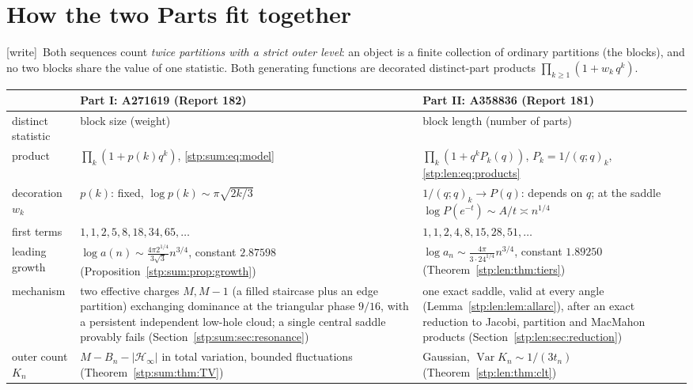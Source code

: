 \documentclass[11pt]{article}
\theoremstyle{remark}\newtheorem{remark}[theorem]{Remark}
\newcommand{\cH}{\mathcal H}
\DeclareMathOperator{\Var}{Var}
\newcommand{\wtag}{\textup{[write]}}
\begin{document}
\section{How the two Parts fit together}\label{stp:sec:guide}

\wtag\ Both sequences count \emph{twice partitions with a strict outer
level}: an object is a finite collection of ordinary partitions (the
blocks), and no two blocks share the value of one statistic. Both
generating functions are decorated distinct-part products
$\prod_{k\ge1}(1+w_k\,q^k)$.

\begin{center}
\small
\begin{tabular}{@{}>{\raggedright\arraybackslash}p{}>{\raggedright\arraybackslash}p{}>{\raggedright\arraybackslash}p{}@{}}
\toprule
& Part I: A271619 (Report 182) & Part II: A358836 (Report 181)\\
\midrule
distinct statistic & block size (weight) & block length (number of parts)\\
product & $\prod_k(1+p(k)q^k)$, \eqref{stp:sum:eq:model} & $\prod_k(1+q^kP_k(q))$, $P_k=1/(q;q)_k$, \eqref{stp:len:eq:products}\\
decoration $w_k$ & $p(k)$: fixed, $\log p(k)\sim\pi\sqrt{2k/3}$ & $1/(q;q)_k\to P(q)$: depends on $q$; at the saddle $\log P(e^{-t})\sim A/t\asymp n^{1/4}$\\
first terms & $1,1,2,5,8,18,34,65,\dots$ & $1,1,2,4,8,15,28,51,\dots$\\
leading growth & $\log a(n)\sim\frac{4\pi2^{1/4}}{3\sqrt3}n^{3/4}$, constant $2.87598$ (Proposition~\ref{stp:sum:prop:growth}) & $\log a_n\sim\frac{4\pi}{3\cdot24^{1/4}}n^{3/4}$, constant $1.89250$ (Theorem~\ref{stp:len:thm:tiers})\\
mechanism & two effective charges $M,M-1$ (a filled staircase plus an edge partition) exchanging dominance at the triangular phase $9/16$, with a persistent independent low-hole cloud; a single central saddle provably fails (Section~\ref{stp:sum:sec:resonance}) & one exact saddle, valid at every angle (Lemma~\ref{stp:len:lem:allarc}), after an exact reduction to Jacobi, partition and MacMahon products (Section~\ref{stp:len:sec:reduction})\\
outer count $K_n$ & $M-B_n-|\cH_\infty|$ in total variation, bounded fluctuations (Theorem~\ref{stp:sum:thm:TV}) & Gaussian, $\Var K_n\sim1/(3t_n)$ (Theorem~\ref{stp:len:thm:clt})\\
\bottomrule
\end{tabular}
\end{center}
\end{document}
